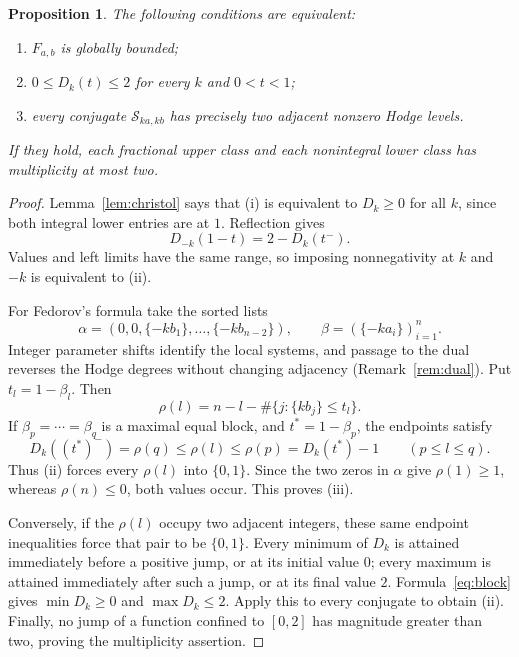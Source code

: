 \documentclass[11pt]{amsart}
\newtheorem{proposition}[theorem]{Proposition}
\theoremstyle{definition}
\theoremstyle{remark}
\numberwithin{equation}{section}
\newcommand{\cS}{\mathcal{S}}
\newcommand{\Fab}{F_{a,b}}
\begin{document}
\begin{proposition}\label{prop:twolevel}
The following conditions are equivalent:
\begin{enumerate}[label=\textup{(\roman*)},leftmargin=2em]
\item $\Fab$ is globally bounded;
\item $0\le D_k(t)\le2$ for every $k$ and $0<t<1$;
\item every conjugate $\cS_{ka,kb}$ has precisely two adjacent nonzero Hodge levels.
\end{enumerate}
If they hold, each fractional upper class and each nonintegral lower class has multiplicity at most two.
\end{proposition}
\begin{proof}
Lemma~\ref{lem:christol} says that (i) is equivalent to $D_k\ge0$ for all $k$, since both integral lower entries are at $1$. Reflection gives
\begin{equation}\label{eq:reflection}
D_{-k}(1-t)=2-D_k(t^-).
\end{equation}
Values and left limits have the same range, so imposing nonnegativity at $k$ and $-k$ is equivalent to (ii).

For Fedorov's formula take the sorted lists
\[
\alpha=(0,0,\{-kb_1\},\dots,\{-kb_{n-2}\}),\qquad
\beta=(\{-ka_i\})_{i=1}^n.
\]
Integer parameter shifts identify the local systems, and passage to the dual reverses the Hodge degrees without changing adjacency (Remark~\ref{rem:dual}). Put $t_l=1-\beta_l$. Then
\[
\rho(l)=n-l-\#\{j:\{kb_j\}\le t_l\}.
\]
If $\beta_p=\cdots=\beta_q$ is a maximal equal block, and $t^*=1-\beta_p$, the endpoints satisfy
\begin{equation}\label{eq:block}
D_k((t^*)^-)=\rho(q)\le\rho(l)\le\rho(p)=D_k(t^*)-1
\qquad(p\le l\le q).
\end{equation}
Thus (ii) forces every $\rho(l)$ into $\{0,1\}$. Since the two zeros in $\alpha$ give $\rho(1)\ge1$, whereas $\rho(n)\le0$, both values occur. This proves (iii).

Conversely, if the $\rho(l)$ occupy two adjacent integers, these same endpoint inequalities force that pair to be $\{0,1\}$. Every minimum of $D_k$ is attained immediately before a positive jump, or at its initial value $0$; every maximum is attained immediately after such a jump, or at its final value $2$. Formula~\eqref{eq:block} gives $\min D_k\ge0$ and $\max D_k\le2$. Apply this to every conjugate to obtain (ii). Finally, no jump of a function confined to $[0,2]$ has magnitude greater than two, proving the multiplicity assertion.
\end{proof}
\end{document}
